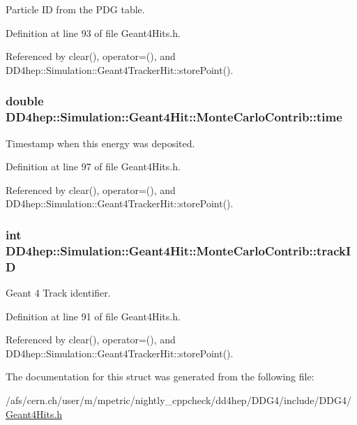 Particle ID from the PDG table. 

Definition at line 93 of file Geant4Hits.h.

Referenced by clear(), operator=(), and DD4hep::Simulation::Geant4TrackerHit::storePoint().\hypertarget{struct_d_d4hep_1_1_simulation_1_1_geant4_hit_1_1_monte_carlo_contrib_aa843f5069ad2f9e03d085bda49e9b658}{
\subsubsection[{time}]{\setlength{\rightskip}{0pt plus 5cm}double {\bf DD4hep::Simulation::Geant4Hit::MonteCarloContrib::time}}}
\label{struct_d_d4hep_1_1_simulation_1_1_geant4_hit_1_1_monte_carlo_contrib_aa843f5069ad2f9e03d085bda49e9b658}


Timestamp when this energy was deposited. 

Definition at line 97 of file Geant4Hits.h.

Referenced by clear(), operator=(), and DD4hep::Simulation::Geant4TrackerHit::storePoint().\hypertarget{struct_d_d4hep_1_1_simulation_1_1_geant4_hit_1_1_monte_carlo_contrib_a9dff0f94a376999512fc5d80ac2e2309}{
\subsubsection[{trackID}]{\setlength{\rightskip}{0pt plus 5cm}int {\bf DD4hep::Simulation::Geant4Hit::MonteCarloContrib::trackID}}}
\label{struct_d_d4hep_1_1_simulation_1_1_geant4_hit_1_1_monte_carlo_contrib_a9dff0f94a376999512fc5d80ac2e2309}


Geant 4 Track identifier. 

Definition at line 91 of file Geant4Hits.h.

Referenced by clear(), operator=(), and DD4hep::Simulation::Geant4TrackerHit::storePoint().

The documentation for this struct was generated from the following file:\begin{DoxyCompactItemize}
\item 
/afs/cern.ch/user/m/mpetric/nightly\_\-cppcheck/dd4hep/DDG4/include/DDG4/\hyperlink{_geant4_hits_8h}{Geant4Hits.h}\end{DoxyCompactItemize}
